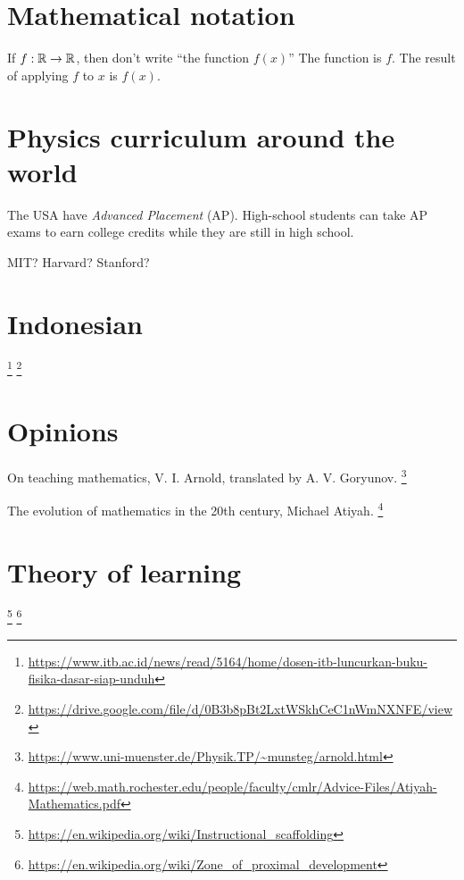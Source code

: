 \section{Mathematical notation}

If \(f : \mathbb{R} \to \mathbb{R}\), then don't write \enquote{the function \(f(x)\)}
The function is \(f\).
The result of applying \(f\) to \(x\) is \(f(x)\).

\section{Physics curriculum around the world}


The USA have \emph{Advanced Placement} (AP).
High-school students can take AP exams to earn college credits while they are still in high school.

MIT? Harvard? Stanford?

\section{Indonesian}

\footnote{\url{https://www.itb.ac.id/news/read/5164/home/dosen-itb-luncurkan-buku-fisika-dasar-siap-unduh}}%
\footnote{\url{https://drive.google.com/file/d/0B3b8pBt2LxtWSkhCeC1nWmNXNFE/view}}

\section{Opinions}

On teaching mathematics, V. I. Arnold,
translated by A. V. Goryunov.%
\footnote{\url{https://www.uni-muenster.de/Physik.TP/~munsteg/arnold.html}}

The evolution of mathematics in the 20th century,
Michael Atiyah.%
\footnote{\url{https://web.math.rochester.edu/people/faculty/cmlr/Advice-Files/Atiyah-Mathematics.pdf}}

\section{Theory of learning}

\footnote{\url{https://en.wikipedia.org/wiki/Instructional_scaffolding}}%
\footnote{\url{https://en.wikipedia.org/wiki/Zone_of_proximal_development}}
